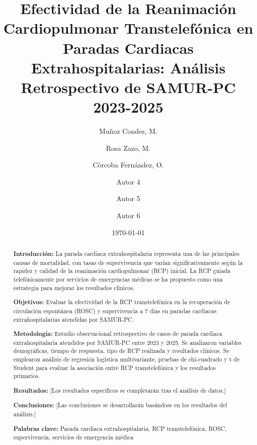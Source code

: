 \documentclass[10pt,a4paper]{article}
\title{\textbf{Efectividad de la Reanimación Cardiopulmonar Transtelefónica en Paradas Cardiacas Extrahospitalarias: Análisis Retrospectivo de SAMUR-PC 2023-2025}}
\author[1]{Muñoz Condes, M.}
\author[1]{Rosa Zazo, M.}
\author[1]{Córcoba Fernández, O.}
\author[1]{Autor 4}
\author[1]{Autor 5}
\author[1]{Autor 6}
\affil[1]{SAMUR-PC, Madrid, España}
\date{\today}
\begin{document}
\maketitle

\begin{abstract}
\textbf{Introducción:} La parada cardiaca extrahospitalaria representa una de las principales causas de mortalidad, con tasas de supervivencia que varían significativamente según la rapidez y calidad de la reanimación cardiopulmonar (RCP) inicial. La RCP guiada telefónicamente por servicios de emergencias médicas se ha propuesto como una estrategia para mejorar los resultados clínicos.

\textbf{Objetivos:} Evaluar la efectividad de la RCP transtelefónica en la recuperación de circulación espontánea (ROSC) y supervivencia a 7 días en paradas cardiacas extrahospitalarias atendidas por SAMUR-PC.

\textbf{Metodología:} Estudio observacional retrospectivo de casos de parada cardiaca extrahospitalaria atendidos por SAMUR-PC entre 2023 y 2025. Se analizaron variables demográficas, tiempo de respuesta, tipo de RCP realizada y resultados clínicos. Se emplearon análisis de regresión logística multivariante, pruebas de chi-cuadrado y t de Student para evaluar la asociación entre RCP transtelefónica y los resultados primarios.

\textbf{Resultados:} [Los resultados específicos se completarán tras el análisis de datos.]

\textbf{Conclusiones:} [Las conclusiones se desarrollarán basándose en los resultados del análisis.]

\textbf{Palabras clave:} Parada cardiaca extrahospitalaria, RCP transtelefónica, ROSC, supervivencia, servicios de emergencia médica
\end{abstract}

\newpage
\end{document}
